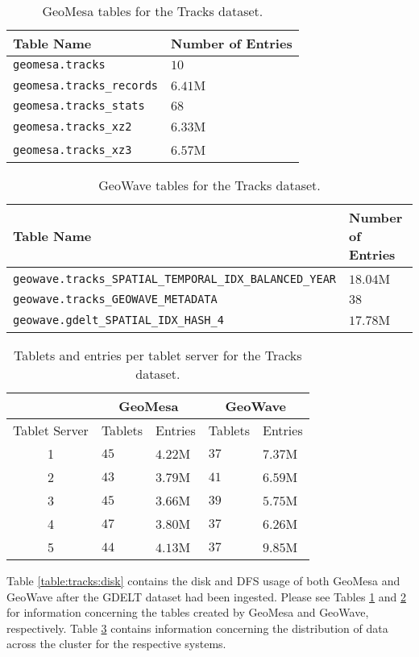 \begin{table}[h!tb]
  \centering
  \begin{tabular}{ | l | l | }
    \hline
    Table Name & Number of Entries \\ \hline
    \texttt{geomesa.tracks} & $10$ \\
    \texttt{geomesa.tracks\_records} & $6.41$M \\
    \texttt{geomesa.tracks\_stats} & $68$ \\
    \texttt{geomesa.tracks\_xz2} & $6.33$M \\
    \texttt{geomesa.tracks\_xz3} & $6.57$M \\
    \hline
  \end{tabular}
  \caption{GeoMesa tables for the Tracks dataset.}
  \label{table:tracks:geomesa:tables}
\end{table}

\begin{table}[h!tb]
  \centering
  \begin{tabular}{ | l | l | }
    \hline
    Table Name & Number of Entries \\ \hline
    \texttt{geowave.tracks\_SPATIAL\_TEMPORAL\_IDX\_BALANCED\_YEAR} & $18.04$M \\
    \texttt{geowave.tracks\_GEOWAVE\_METADATA} & $38$ \\
    \texttt{geowave.gdelt\_SPATIAL\_IDX\_HASH\_4} & $17.78$M \\
    \hline
  \end{tabular}
  \caption{GeoWave tables for the Tracks dataset.}
  \label{table:tracks:geowave:tables}
\end{table}

\begin{table}[h!tb]
  \centering
  \begin{tabular}{ | c| | l | l || l | l |}
    \hline
    & \multicolumn{2}{c||}{GeoMesa} & \multicolumn{2}{c|}{GeoWave} \\ \hline
    Tablet Server & Tablets & Entries & Tablets & Entries \\ \hline
    1 & $45$ & $4.22$M & $37$ & $7.37$M \\
    2 & $43$ & $3.79$M & $41$ & $6.59$M \\
    3 & $45$ & $3.66$M & $39$ & $5.75$M \\
    4 & $47$ & $3.80$M & $37$ & $6.26$M \\
    5 & $44$ & $4.13$M & $37$ & $9.85$M \\
    \hline
  \end{tabular}
  \caption{Tablets and entries per tablet server for the Tracks dataset.}
  \label{table:tracks:tablets}
\end{table}

Table \ref{table:tracks:disk} contains the disk and DFS usage of both GeoMesa and GeoWave after the GDELT dataset had been ingested.
Please see Tables \ref{table:tracks:geomesa:tables} and \ref{table:tracks:geowave:tables} for information concerning the tables created by GeoMesa and GeoWave, respectively.
Table \ref{table:tracks:tablets} contains information concerning the distribution of data across the cluster for the respective systems.

